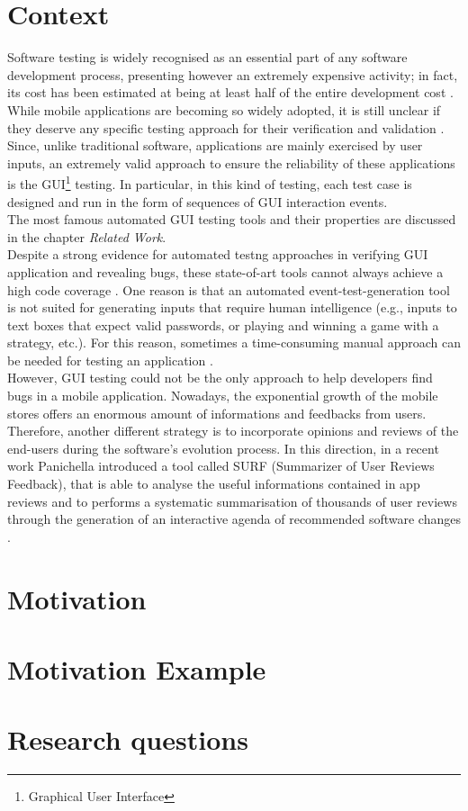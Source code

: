 \section{Context}
Software testing is widely recognised as an essential part of any software development process, presenting however an extremely expensive activity; in fact, its cost has been estimated at being at least half of the entire development cost \cite{Beizer:1990:STT:79060}. \\ 
While mobile applications are becoming so widely adopted, it is still unclear if they deserve any specific testing approach for their verification and validation \cite{Amalfitano2013}.\\
Since, unlike traditional software, applications are mainly exercised by user inputs, an extremely valid approach to ensure the reliability of these applications is the GUI\footnote{Graphical User Interface} testing. In particular, in this kind of testing, each test case is designed and run in the form of sequences of GUI interaction events. \\
The most famous automated GUI testing tools and their properties are discussed in the chapter \textit{Related Work}. \\
Despite a strong evidence for automated testng approaches in verifying GUI application and revealing bugs, these state-of-art tools cannot always achieve a high code coverage \cite{Nagappan2015}. One reason is that an automated event-test-generation tool is not suited for generating inputs that require human intelligence (e.g., inputs to text boxes that expect valid passwords, or playing and winning a game with a strategy, etc.).
For this reason, sometimes a time-consuming manual approach can be needed for testing an application \cite{Nagappan2015}. \\
However, GUI testing could not be the only approach to help developers find bugs in a mobile application. Nowadays, the exponential growth of the mobile stores offers an enormous amount of informations and feedbacks from users. Therefore, another different strategy is to incorporate opinions and reviews of the end-users during the software's evolution process. \newline
In this direction, in a recent work Panichella \etal introduced a tool called SURF (Summarizer of User Reviews Feedback), that is able to analyse the useful informations contained in app reviews and to performs a systematic summarisation of thousands of user reviews through the generation of an interactive agenda of recommended software changes \cite{DBLP:conf/sigsoft/SorboPASVCG16}.

\section{Motivation}
\section{Motivation Example}
\section{Research questions}